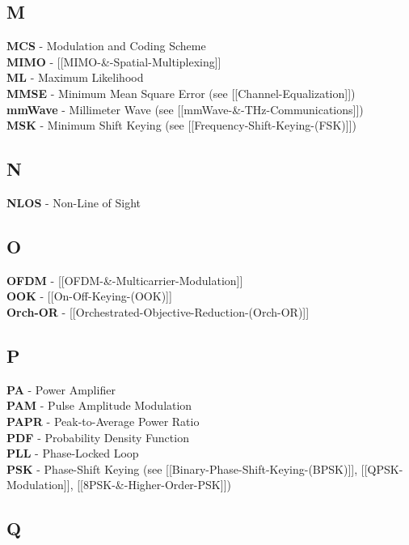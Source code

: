 \subsection{M}\label{m}

\textbf{MCS} - Modulation and Coding Scheme\\
\textbf{MIMO} - {[}{[}MIMO-\&-Spatial-Multiplexing{]}{]}\\
\textbf{ML} - Maximum Likelihood\\
\textbf{MMSE} - Minimum Mean Square Error (see
{[}{[}Channel-Equalization{]}{]})\\
\textbf{mmWave} - Millimeter Wave (see
{[}{[}mmWave-\&-THz-Communications{]}{]})\\
\textbf{MSK} - Minimum Shift Keying (see
{[}{[}Frequency-Shift-Keying-(FSK){]}{]})

\subsection{N}\label{n}

\textbf{NLOS} - Non-Line of Sight

\subsection{O}\label{o}

\textbf{OFDM} - {[}{[}OFDM-\&-Multicarrier-Modulation{]}{]}\\
\textbf{OOK} - {[}{[}On-Off-Keying-(OOK){]}{]}\\
\textbf{Orch-OR} -
{[}{[}Orchestrated-Objective-Reduction-(Orch-OR){]}{]}

\subsection{P}\label{p}

\textbf{PA} - Power Amplifier\\
\textbf{PAM} - Pulse Amplitude Modulation\\
\textbf{PAPR} - Peak-to-Average Power Ratio\\
\textbf{PDF} - Probability Density Function\\
\textbf{PLL} - Phase-Locked Loop\\
\textbf{PSK} - Phase-Shift Keying (see
{[}{[}Binary-Phase-Shift-Keying-(BPSK){]}{]},
{[}{[}QPSK-Modulation{]}{]}, {[}{[}8PSK-\&-Higher-Order-PSK{]}{]})

\subsection{Q}\label{q}

